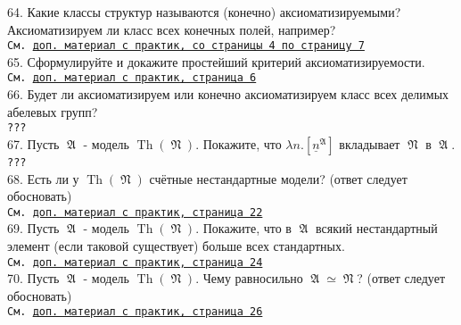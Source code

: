 \documentclass[a4paper,100pt]{article}
\theoremstyle{indented}
\theoremstyle{definition}
\theoremstyle{remark}
\DeclareMathOperator{\Th}{Th}
\DeclareMathOperator{\GA}{\mathfrak{A}}
\DeclareMathOperator{\GN}{\mathfrak{N}}
\begin{document}
64. Какие классы структур называются (конечно) аксиоматизируемыми? Аксиоматизируем ли класс всех конечных полей, например? \\ 

\texttt{См. \href{http://www.mi-ras.ru/~speranski/courses/logic-1-2021-spring/slides-axiomatisability.pdf}{доп. материал с практик, со страницы 4 по страницу 7}} \\

65. Сформулируйте и докажите простейший критерий аксиоматизируемости. \\ 

\texttt{См. \href{http://www.mi-ras.ru/~speranski/courses/logic-1-2021-spring/slides-axiomatisability.pdf}{доп. материал с практик, страница 6}} \\

66. Будет ли аксиоматизируем или конечно аксиоматизируем класс всех делимых абелевых групп? \\ 

\texttt{???} \\ 

67. Пусть $\GA$ - модель $\Th(\GN)$. Покажите, что $\lambda n.[\underline{n}^{\GA}]$ вкладывает $\GN$ в $\GA$. \\ 

\texttt{???} \\ 

68. Есть ли у $\Th(\GN)$ счётные нестандартные модели? (ответ следует обосновать) \\ 

\texttt{См. \href{http://www.mi-ras.ru/~speranski/courses/logic-1-2021-spring/slides-axiomatisability.pdf}{доп. материал с практик, страница 22}} \\

69. Пусть $\GA$ - модель $\Th(\GN)$. Покажите, что в $\GA$ всякий нестандартный элемент (если таковой существует) больше всех стандартных. \\ 

\texttt{См. \href{http://www.mi-ras.ru/~speranski/courses/logic-1-2021-spring/slides-axiomatisability.pdf}{доп. материал с практик, страница 24}} \\

70. Пусть $\GA$ - модель $\Th(\GN)$. Чему равносильно $\GA \simeq \GN$? (ответ следует обосновать) \\

\texttt{См. \href{http://www.mi-ras.ru/~speranski/courses/logic-1-2021-spring/slides-axiomatisability.pdf}{доп. материал с практик, страница 26}} \\
\end{document}
